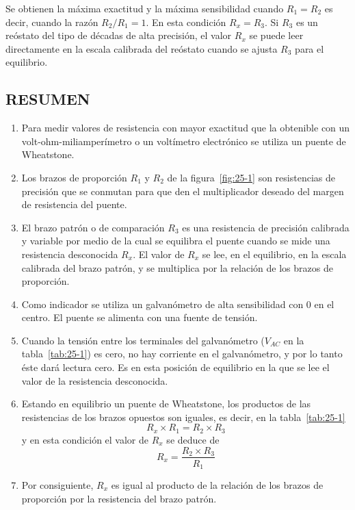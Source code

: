 \documentclass{article}
\numberwithin{equation}{subsection}
\numberwithin{figure}{section}
\numberwithin{table}{section}
\begin{document}
Se obtienen la máxima exactitud y la máxima sensibilidad cuando $R_1 = R_2$ es decir, cuando la razón 
$R_2/R_1 = 1$. En esta condición $R_x = R_3$. Si $R_3$ es un reóstato del tipo de décadas de alta precisión, 
el valor $R_x$ se puede leer directamente en la escala calibrada del reóstato cuando se ajusta $R_3$ para 
el equilibrio.

\subsection{RESUMEN}
\begin{enumerate}
    \item Para medir valores de resistencia con mayor exactitud que la obtenible con un volt-ohm-miliamperímetro 
    o un voltímetro electrónico se utiliza un puente de Wheatstone.
    \item Los brazos de proporción $R_1$ y $R_2$ de la figura~\ref{fig:25-1} son resistencias de precisión que se 
    conmutan para que den el multiplicador deseado del margen de resistencia del puente.
    \item El brazo patrón o de comparación $R_3$ es una resistencia de precisión calibrada y variable por medio de 
    la cual se equilibra el puente cuando se mide una resistencia desconocida $R_x$. El valor de $R_x$ se lee, en 
    el equilibrio, en la escala calibrada del brazo patrón, y se multiplica por la relación de los brazos 
    de proporción.
    \item Como indicador se utiliza un galvanómetro de alta sensibilidad con 0 en el centro. El puente se alimenta 
    con una fuente de tensión.
    \item Cuando la tensión entre los terminales del galvanómetro ($V_{AC}$ en la tabla~\ref{tab:25-1}) es cero, no 
    hay corriente en el galvanómetro, y por lo tanto éste dará lectura cero. Es en esta posición de equilibrio en 
    la que se lee el valor de la resistencia desconocida.
    \item Estando en equilibrio un puente de Wheatstone, los productos de las resistencias de los brazos opuestos son 
    iguales, es decir, en la tabla~\ref{tab:25-1}
    \begin{equation} R_x \times R_1 = R_2 \times R_3 \label{eq:resumen_1} \end{equation}
    y en esta condición el valor de $R_x$ se deduce de
    \begin{equation} R_x = \frac{R_2 \times R_3}{R_1} \label{eq:resumen_2} \end{equation}
    \item Por consiguiente, $R_x$ es igual al producto de la relación de los brazos de proporción por la resistencia 
    del brazo patrón.
\end{enumerate}
\end{document}
